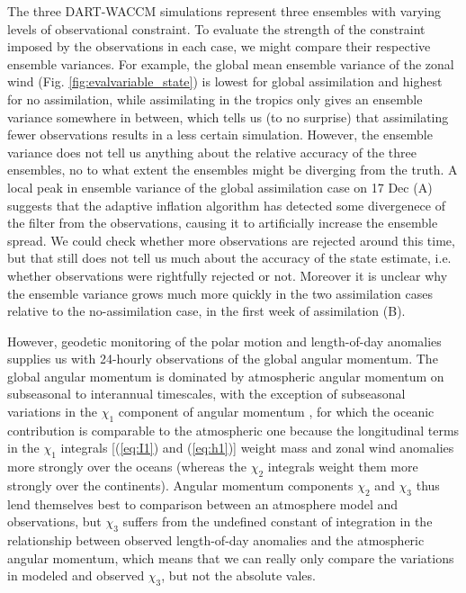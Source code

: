 The three DART-WACCM simulations represent three ensembles with varying levels of observational constraint. 
To evaluate the strength of the constraint imposed by the observations in each case, we might compare their respective ensemble variances. 
For example, the global mean ensemble variance of the zonal wind (Fig. \ref{fig:evalvariable_state}) 
is lowest for global assimilation and highest for no assimilation, while assimilating in the tropics only gives an ensemble variance somewhere in between,
which tells us (to no surprise) that assimilating fewer observations results in a less certain simulation.
However, the ensemble variance does not tell us anything about the relative accuracy of the three ensembles, no to what extent the ensembles might be diverging from the truth. 
A local peak in ensemble variance of the global assimilation case on 17 Dec (A) suggests that the adaptive inflation algorithm has detected some divergenece of the filter from the observations, causing it to artificially increase the ensemble spread. 
We could check whether more observations are rejected around this time, but that still does not tell us much about the accuracy of the state estimate, i.e. whether observations were rightfully rejected or not. 
Moreover it is unclear why the ensemble variance grows much more quickly in the two assimilation cases relative to the no-assimilation case, in the first week of assimilation (B).   

However, geodetic monitoring of the polar motion and length-of-day anomalies
supplies us with 24-hourly observations of the global
angular momentum.
The global angular momentum is dominated by atmospheric angular momentum on subseasonal to interannual timescales, with the exception of subseasonal variations in the $\chi_1$ component of angular momentum \citep[e.g.,][]{Neef2012}, for which the oceanic contribution is comparable to the atmospheric one 
because the 
longitudinal terms in the $\chi_1$ integrals [(\ref{eq:I1}) and (\ref{eq:h1})] weight mass and zonal wind anomalies more strongly over the oceans (whereas the $\chi_2$ integrals weight them more strongly over the continents).
Angular momentum components $\chi_2$ and $\chi_3$ thus lend themselves best to comparison between an atmosphere model and observations, but 
$\chi_3$ 
suffers from the undefined constant of integration in the relationship between observed length-of-day anomalies and the atmospheric angular momentum, which means that
we can really only compare the variations in modeled and observed $\chi_3$, but not the absolute vales. 

